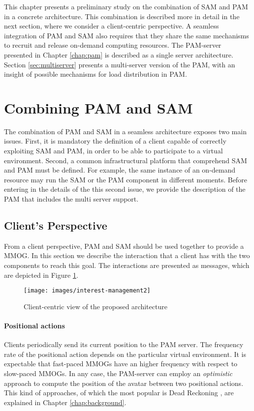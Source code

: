 \documentclass[final,10pt,a5paper]{phdimt}
\theoremstyle{definition}
\begin{document}
This chapter presents a preliminary study on the combination of SAM and PAM in a concrete architecture.
This combination is described more in detail in the next section, where we consider a client-centric perspective.
A seamless integration of PAM and SAM also requires that they share the same mechanisms to recruit and release on-demand computing resources. 
The PAM-server presented in Chapter \ref{chap:pam} is described as a single server architecture.
Section \ref{sec:multiserver} presents a multi-server version of the PAM, with an insight of possible mechanisms for load distribution in PAM.





\section{Combining PAM and SAM}




The combination of PAM and SAM in a seamless architecture exposes two main issues.
First, it is mandatory the definition of a client capable of correctly exploiting SAM and PAM, in order to be able to participate to a virtual environment. Second, a common infrastructural platform that comprehend SAM and PAM must be defined. For example, the same instance of an on-demand resource may run the SAM or the PAM component in different moments. 
Before entering in the details of the this second issue, we provide the description of the PAM that includes the multi server support.


\subsection{Client's Perspective}

From a client perspective, PAM and SAM should be used together to provide a MMOG.
In this section we describe the interaction that a client has with the two components to reach this goal.
The interactions are presented as messages, which are depicted in Figure \ref{fig:interest-management}.


\begin{figure}[tbh]
\centering
\texttt{[image: images/interest-management2]}
\caption{Client-centric view of the proposed architecture}\label{fig:interest-management}
\end{figure}


\paragraph{Positional actions}
Clients periodically send its current position to the PAM server. The frequency rate of the positional action depends on the particular virtual environment. It is expectable that fast-paced MMOGs have an higher frequency with respect to slow-paced MMOGs. In any case, the PAM-server can employ an \textit{optimistic} approach to compute the position of the avatar between two positional actions. This kind of approaches, of which the most popular is Dead Reckoning \cite{pantel2002suitability}, are explained in Chapter \ref{chap:background}. 
\end{document}
